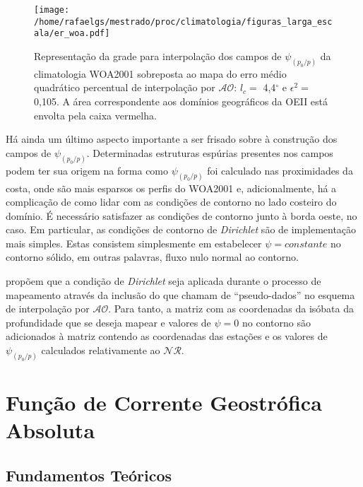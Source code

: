 \begin{figure}[hb]
 \begin{center}
  \texttt{[image: /home/rafaelgs/mestrado/proc/climatologia/figuras\_larga\_escala/er\_woa.pdf]}
 \end{center}
 \vspace{-.25cm}
 \renewcommand{\baselinestretch}{1}
 \caption{\label{fig:grades} \small Representação da grade para interpolação dos campos de $\psi_{(p_0/p)}$ 
 da climatologia WOA2001 sobreposta ao mapa do erro médio quadrático percentual de interpolação por 
 $\mathcal{AO}$: $l_c =$ 4,4$^\circ$ e $\epsilon^{2} =$ 0,105. A área correspondente aos domínios geográficos da
OEII está envolta pela caixa vermelha.}
\end{figure}

Há ainda um último aspecto importante a ser frisado sobre à construção dos campos de $\psi_{(p_0/p)}$. 
Determinadas estruturas espúrias presentes nos campos podem ter sua origem na forma como 
$\psi_{(p_0/p)}$ foi calculado nas proximidades da costa, onde são mais esparsos os perfis 
do WOA2001 e, adicionalmente, há 
a complicação de como lidar com as condições de contorno no lado costeiro do domínio. É necessário 
satisfazer as condições de contorno junto à borda oeste, no caso. Em particular, as 
condições de contorno de \textit{Dirichlet} são de implementação mais simples. Estas consistem 
simplesmente em estabelecer $\psi = constante$ no contorno sólido, em outras palavras, fluxo 
nulo normal ao contorno.

\cite{silveira_etal2000B} propõem que a condição de \textit{Dirichlet} seja aplicada durante o 
processo de mapeamento através da inclusão do que chamam de ``pseudo-dados'' no esquema de 
interpolação por $\mathcal{AO}$. Para tanto, a matriz com as coordenadas da isóbata da 
profundidade que se deseja mapear e valores de $\psi = 0$ no contorno são adicionados à 
matriz contendo as coordenadas das estações e os valores de $\psi_{(p_0/p)}$ calculados relativamente 
ao $\mathcal{NR}$.


\section{Função de Corrente Geostrófica Absoluta} \label{sec:psiref}

\subsection{Fundamentos Teóricos} \label{sec:psiref_teo}

